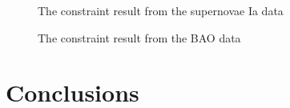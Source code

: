 \documentclass[twocolumn]{aastex631}
\begin{document}
   \begin{figure}[htbp]
      \centering
      \caption{The constraint result from the supernovae
      Ia data}
   \end{figure}

   \begin{figure}[htbp]
      \centering
      \caption{The constraint result from the BAO data}
   \end{figure}

\section{Conclusions}



\end{document}
